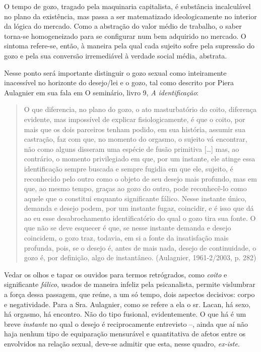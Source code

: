 O tempo de gozo, tragado pela maquinaria capitalista, é substância
incalculável no plano da existência, mas passa a ser matematizado
ideologicamente no interior da lógica do mercado. Como a abstração do
valor médio de trabalho, o saber torna-se homogeneizado para se
configurar num bem adquirido no mercado. O sintoma refere-se, então, à
maneira pela qual cada sujeito sofre pela supressão do gozo e pela sua
conversão irremediável à verdade social média, abstrata.

Nesse ponto será importante distinguir o gozo sexual como inteiramente
inacessível no horizonte do desejo/lei e o gozo, tal como descrito por
Piera Aulagnier em sua fala em O seminário, livro 9, \emph{A
identificação}:

\begin{quote}
O que diferencia, no plano do gozo, o ato masturbatório do coito,
diferença evidente, mas impossível de explicar fisiologicamente, é que o
coito, por mais que os dois parceiros tenham podido, em sua história,
assumir sua castração, faz com que, no momento do orgasmo, o sujeito vá
encontrar, não como alguns disseram uma espécie de fusão primitiva
{[}\ldots{}{]} mas, ao contrário, o momento privilegiado em que, por um
instante, ele atinge essa identificação sempre buscada e sempre fugidia
em que ele, sujeito, é reconhecido pelo outro como o objeto de seu
desejo mais profundo, mas em que, ao mesmo tempo, graças ao gozo do
outro, pode reconhecê-lo como aquele que o constitui enquanto
significante fálico. Nesse instante único, demanda e desejo podem, por
um instante fugaz, coincidir, e é isso que dá ao eu esse desabrochamento
identificatório do qual o gozo tira sua fonte. O que não se deve
esquecer é que, se nesse instante demanda e desejo coincidem, o gozo
traz, todavia, em si a fonte da insatisfação mais profunda, pois, se o
desejo é, antes de mais nada, desejo de continuidade, o gozo é, por
definição, algo de instantâneo. (Aulagnier, 1961-2/2003, p. 282)
\end{quote}

Vedar os olhos e tapar os ouvidos para termos retrógrados, como
\emph{coito} e significante \emph{fálico}, usados de maneira infeliz
pela psicanalista, permite vislumbrar a força dessa passagem, que reúne,
a um só tempo, dois aspectos decisivos: corpo e negatividade. Para a
Sra. Aulagnier, como se refere a ela o sr. Lacan, há sexo, há orgasmo,
há encontro. Não do tipo fusional, evidentemente. O que há é um breve
\emph{instante} no qual o desejo é reciprocamente entrevisto --, ainda
que aí não haja nenhum tipo de equiparação mensurável e quantitativa de
afetos entre os envolvidos na relação sexual, deve-se admitir que esta,
nesse quadro, \emph{ex-iste}.

